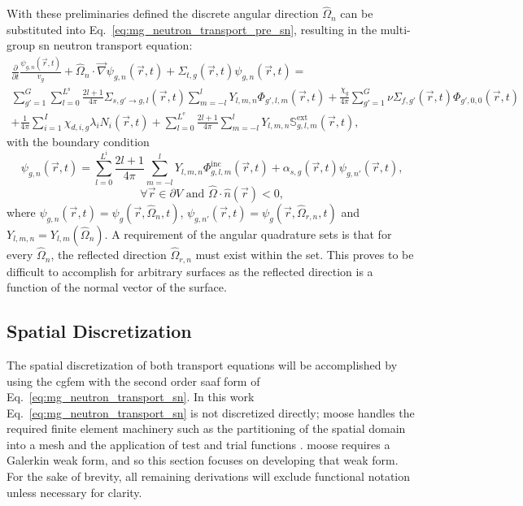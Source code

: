With these preliminaries defined the discrete angular direction $\hat{\Omega}_{n}$ can be substituted into Eq.~\ref{eq:mg_neutron_transport_pre_sn}, resulting in the multi-group \acrshort{sn} neutron transport equation:
\begin{multline}\label{eq:mg_neutron_transport_sn}
    \frac{\partial}{\partial t}\frac{\psi_{g,n}(\vec{r}, t)}{v_{g}} + \hat{\Omega}_{n}\cdot\vec{\nabla}\psi_{g,n}(\vec{r}, t) + \Sigma_{t,g}(\vec{r}, t)\psi_{g,n}(\vec{r}, t)
    = 
    \\\sum_{g' = 1}^{G}\sum_{l = 0}^{L^{\text{s}}}\frac{2l + 1}{4\pi}\Sigma_{s, g'\rightarrow g, l}(\vec{r}, t)\sum_{m = -l}^{l} Y_{l,m,n}\Phi_{g', l, m}(\vec{r}, t)
    + \frac{\chi_{g}}{4\pi}\sum_{g' = 1}^{G} \nu\Sigma_{f,g'}(\vec{r}, t)\Phi_{g',0,0}(\vec{r}, t)
    \\+ \frac{1}{4\pi}\sum_{i = 1}^{I} \chi_{d,i,g}\lambda_{i}N_{i}(\vec{r}, t) + \sum_{l = 0}^{L^{\text{e}}} \frac{2l + 1}{4\pi} \sum_{m = -l}^{l}Y_{l,m,n}\mathbb{S}^{\text{ext}}_{g,l,m}(\vec{r}, t)\text{,}
\end{multline}
with the boundary condition 
\begin{equation}\label{eq:sn_mg_bc}
    \psi_{g,n}(\vec{r}, t) 
    = \sum_{l = 0}^{L^{\text{i}}} \frac{2l + 1}{4\pi} \sum_{m = -l}^{l}Y_{l,m,n}\Phi^{\text{inc}}_{g,l,m}(\vec{r}, t) 
    + \alpha_{s,g}(\vec{r}, t)\psi_{g,n'}(\vec{r}, t)\text{,}
\end{equation}
\begin{equation*}
    \forall \vec{r}\in\partial V \text{ and } \hat{\Omega}\cdot\hat{n}(\vec{r}) < 0\text{,}
\end{equation*}
where $\psi_{g,n}(\vec{r}, t) = \psi_{g}(\vec{r}, \hat{\Omega}_{n}, t)$, $\psi_{g,n'}(\vec{r}, t) = \psi_{g}(\vec{r}, \hat{\Omega}_{r,n}, t)$ and $Y_{l,m,n} = Y_{l,m}(\hat{\Omega}_{n})$. A requirement of the angular quadrature sets is that for every $\hat{\Omega}_{n}$, the reflected direction $\hat{\Omega}_{r,n}$ must exist within the set. This proves to be difficult to accomplish for arbitrary surfaces as the reflected direction is a function of the normal vector of the surface.

\subsection{Spatial Discretization}
\label{solver:radiation_transport:space}

The spatial discretization of both transport equations will be accomplished by using the \acrshort{cgfem} with the second order \acrlong{saaf} form of Eq.~\ref{eq:mg_neutron_transport_sn}. In this work Eq.~\ref{eq:mg_neutron_transport_sn} is not discretized directly; \acrshort{moose} handles the required finite element machinery such as the partitioning of the spatial domain into a mesh and the application of test and trial functions \cite{moose_0}. \acrshort{moose} requires a Galerkin weak form, and so this section focuses on developing that weak form. For the sake of brevity, all remaining derivations will exclude functional notation unless necessary for clarity.

